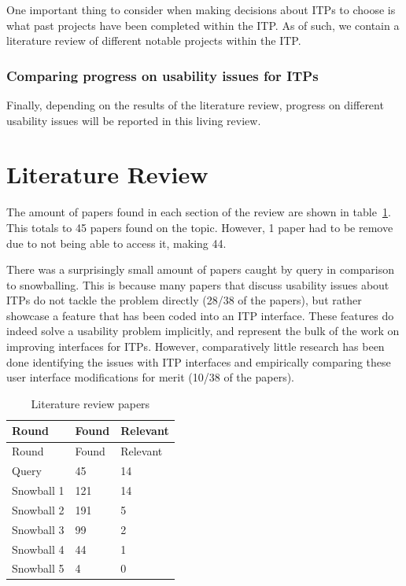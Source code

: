 \documentclass[
]{article}
\begin{document}
One important thing to consider when making decisions about ITPs to
choose is what past projects have been completed within the ITP. As of
such, we contain a literature review of different notable projects
within the ITP.

\hypertarget{comparing-progress-on-usability-issues-for-itps}{%
\subsubsection{Comparing progress on usability issues for
ITPs}\label{comparing-progress-on-usability-issues-for-itps}}

Finally, depending on the results of the literature review, progress on
different usability issues will be reported in this living review.

\hypertarget{literature-review}{%
\section{Literature Review}\label{literature-review}}

The amount of papers found in each section of the review are shown in
table~\protect\hyperlink{tab:litresults}{1}. This totals to 45 papers
found on the topic. However, 1 paper had to be remove due to not being
able to access it, making 44.

There was a surprisingly small amount of papers caught by query in
comparison to snowballing. This is because many papers that discuss
usability issues about ITPs do not tackle the problem directly (28/38 of
the papers), but rather showcase a feature that has been coded into an
ITP interface. These features do indeed solve a usability problem
implicitly, and represent the bulk of the work on improving interfaces
for ITPs. However, comparatively little research has been done
identifying the issues with ITP interfaces and empirically comparing
these user interface modifications for merit (10/38 of the papers).

\hypertarget{tab:litresults}{}
\begin{longtable}[]{@{}lll@{}}
\caption{Literature review papers}\tabularnewline
\toprule
Round & Found & Relevant \\
\midrule
\endfirsthead
\toprule
Round & Found & Relevant \\
\midrule
\endhead
Query & 45 & 14 \\
Snowball 1 & 121 & 14 \\
Snowball 2 & 191 & 5 \\
Snowball 3 & 99 & 2 \\
Snowball 4 & 44 & 1 \\
Snowball 5 & 4 & 0 \\
\bottomrule
\end{longtable}
\end{document}

